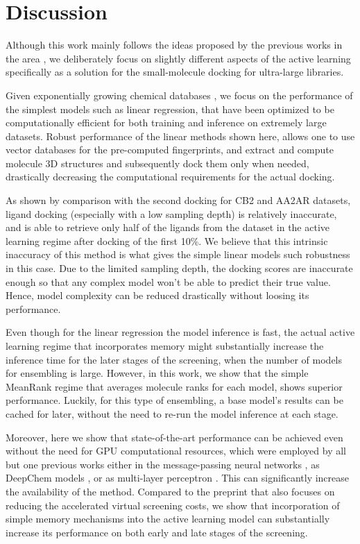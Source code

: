 \section{Discussion}

Although this work mainly follows the ideas proposed by the previous works in the area \cite{deepdocking, logistic_regression, Yang2021_shoichet_active_learning, Graff2021AcceleratingLearning}, we deliberately focus on slightly different aspects of the active learning specifically as a solution for the small-molecule docking for ultra-large libraries. 

Given exponentially growing chemical databases \cite{warr_exploration_2022, lyu_modeling_2023}, we focus on the performance of the simplest models such as linear regression, that have been optimized to be computationally efficient for both training and inference on extremely large datasets. Robust performance of the linear methods shown here, allows one to use vector databases \cite{noauthor_vector_nodate, noauthor_qdrant_nodate, johnson2019_faiss_vector_database} for the pre-computed fingerprints, and extract and compute molecule 3D structures and subsequently dock them only when needed, drastically decreasing the computational requirements for the actual docking.

As shown by comparison with the second docking for CB2 and AA2AR datasets, ligand docking (especially with a low sampling depth) is relatively inaccurate, and is able to retrieve only half of the ligands from the dataset in the active learning regime after docking of the first 10\%. We believe that this intrinsic inaccuracy of this method is what gives the simple linear models such robustness in this case. Due to the limited sampling depth, the docking scores are inaccurate enough so that any complex model won't be able to predict their true value. Hence, model complexity can be reduced drastically without loosing its performance.

Even though for the linear regression the model inference is fast, the actual active learning regime that incorporates memory might substantially increase the inference time for the later stages of the screening, when the number of models for ensembling is large. However, in this work, we show that the simple MeanRank regime that averages molecule ranks for each model, shows superior performance. Luckily, for this type of ensembling, a base model's results can be cached for later, without the need to re-run the model inference at each stage.

Moreover, here we show that state-of-the-art performance can be achieved even without the need for GPU computational resources, which were employed by all but one previous works either in the message-passing neural networks \cite{Graff2021AcceleratingLearning}, as DeepChem models \cite{Yang2021_shoichet_active_learning}, or as multi-layer perceptron \cite{deepdocking}. This can significantly increase the availability of the method. Compared to the preprint \cite{logistic_regression} that also focuses on reducing the accelerated virtual screening costs, we show that incorporation of simple memory mechanisms into the active learning model can substantially increase its performance on both early and late stages of the screening.

